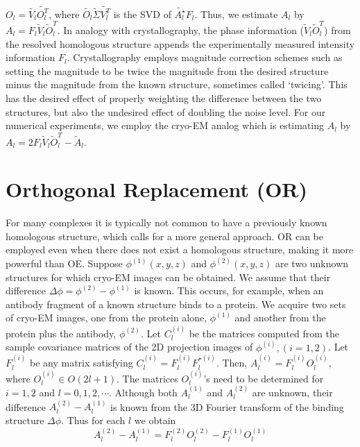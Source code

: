 \documentclass{article}
\begin{document}
$O_l=\tilde{V_l} \tilde{O_l^T}$, where $ \tilde{O_l} \tilde{\Sigma} \tilde{V_l^T}$ is the SVD of $\tilde{A_l^\star}
F_l$. Thus, we estimate $A_l$ by $A_l = F_l \tilde V_l \tilde O_l^T$. In analogy with crystallography, the phase
information ($\tilde V_l \tilde O_l^T$) from the resolved homologous
structure appends the experimentally measured intensity information $F_l$. Crystallography employs
magnitude correction schemes such as setting the magnitude to be twice the magnitude from the desired
structure minus the magnitude from the
known structure, sometimes called `twicing'. This has the desired effect of properly weighting the difference
between the two structures, but also the
undesired effect of doubling the noise level. For our numerical experiments, we employ the cryo-EM analog which is estimating $A_l $ by $A_l = 2F_l \tilde V_l \tilde O_l^T -\tilde A_l$.
\section{ Orthogonal Replacement (OR) }
For many
complexes it is typically not common to have a previously known homologous
structure, which calls for a more general approach. OR can be employed even
when there does not
exist a homologous structure, making
it more powerful than OE. Suppose $\phi^{(1)}(x,y,z)$ and $\phi^{(2)}(x,y,z)$
are two unknown structures
for which cryo-EM images can be obtained.
We assume that their difference $\Delta \phi =\phi^{(2)} -\phi^{(1)}$ is known.
This occurs, for example, when
an antibody fragment of a known structure binds to a protein. We acquire two sets
of cryo-EM images, one from the protein alone, $\phi^{(1)}$
and another from the protein plus the antibody, $\phi^{(2)}$. Let $C_l^{(i)}$ be the matrices computed from the sample covariance
matrices of the 2D projection images of $\phi^{(i)}, (i=1,2)$.
Let $F_l^{(i)}$ be any matrix satisfying $C_l^{(i)} = F_l^{(i)}F_l^{\star(i)}$. Then,
$A_l^{(i)} = F_l^{(i)} O_l^{(i)},$ where $O_l^{(i)} \in O(2l+1)$.
The matrices $O_l^{(i)}$'s need to be determined for $i=1,2$ and $l=0,1,2, \cdots$.
Although both $A_l^{(1)}$ and $A_l^{(2)}$ are unknown, their
difference $A_l^{(2)} -A_l^{(1)}$ is known from
the 3D Fourier transform of the binding structure $\Delta \phi$. Thus for each $l$ we
obtain
\begin{equation}\label{lin}
A_l^{(2)}-A_l^{(1)}=F_l^{(2)}O_l^{(2)}-F_l^{(1)}O_l^{(1)}
\end{equation}
\end{document}
